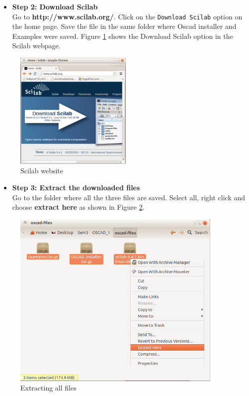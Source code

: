 \begin{itemize}
\item{\textbf{Step 2: Download Scilab }}\\
Go to \textbf{http://www.scilab.org/}. Click on the {\tt Download Scilab} option on the home page. Save the file in the same folder where Oscad installer and Examples were saved. Figure \ref{scilab} shows the Download Scilab option in the Scilab webpage.
\end{itemize}
{}
\begin{figure}[h!]
\centering
\includegraphics[width=0.5\textwidth]{figures/scilab.png}
\caption{Scilab website}
\label{scilab}
\end{figure}
\newpage
\begin{itemize}
\item{\textbf{Step 3: Extract the downloaded files }}\\
Go to the folder where all the three files are saved. Select all, right click and choose \textbf{extract here} as shown in Figure \ref{extract}.
\end{itemize}
\begin{figure}[h!]
\centering
\includegraphics[width=0.9\textwidth]{figures/extract.png}
\caption{Extracting all files}
\label{extract}
\end{figure}
